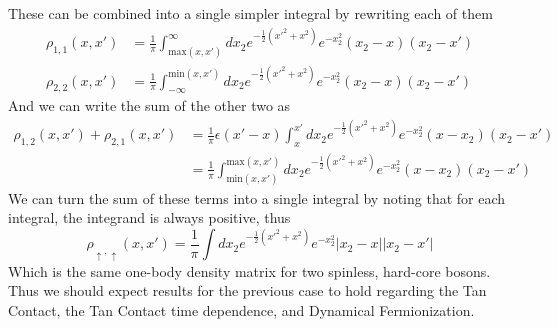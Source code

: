 \documentclass[onecolumn,english,aps,pra]{revtex4}
\begin{document}
These can be combined into a single simpler integral by rewriting each of them
\begin{align*}
\rho_{1, 1}(x, x') &= \frac{1}{\pi} \int^{\infty}_{\text{max}(x, x')} dx_2 e^{-\frac{1}{2} (x'^2 + x^2) } 
 e^{-x_2^2} (x_2 - x)(x_2 - x') \\
\rho_{2,2}(x, x') &= \frac{1}{\pi} \int_{-\infty}^{\text{min}(x, x')} dx_2 e^{-\frac{1}{2} (x'^2 + x^2) } 
e^{-x_2^2} (x_2 - x)(x_2 - x') 
\end{align*}
And we can write the sum of the other two as
\begin{align*}
\rho_{1, 2}(x, x') + \rho_{2, 1}(x, x') & = \frac{1}{\pi} \epsilon(x' - x) \int_{x}^{x'} dx_2 
e^{-\frac{1}{2} (x'^2 + x^2) } e^{-x_2^2}(x - x_2)(x_2 - x')\\
& =  \frac{1}{\pi} \int_{\text{min}(x, x')}^{\text{max}(x, x')} dx_2 
e^{-\frac{1}{2} (x'^2 + x^2) } e^{-x_2^2} (x - x_2)(x_2 - x')
\end{align*}
We can turn the sum of these terms into a single integral by noting that for each integral, the integrand is always positive, thus
%
\begin{equation}
\rho_{\uparrow, \uparrow}(x, x')
 = \frac{1}{\pi} \int dx_2 e^{-\frac{1}{2} (x'^2 + x^2) } e^{-x_2^2} |x_2 - x||x_2 - x'|
\end{equation}
%
Which is the same one-body density matrix for two spinless, hard-core bosons. Thus we should expect results for the previous case to hold regarding the Tan Contact, the Tan Contact time dependence, and Dynamical Fermionization. 
\end{document}
